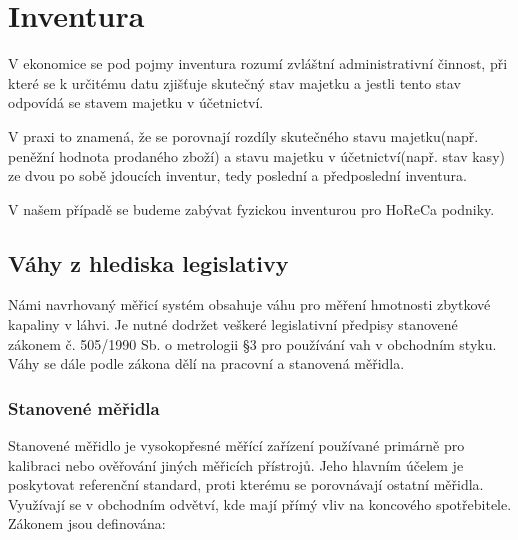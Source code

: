 \chapter{Inventura}
\label{inventura}

V ekonomice se pod pojmy inventura rozumí zvláštní administrativní činnost, při které se k určitému datu zjišťuje skutečný stav majetku a jestli tento stav odpovídá se stavem majetku v účetnictví. 
\cite{Zákon o účetnictví}

V praxi to znamená, že se porovnají rozdíly skutečného stavu majetku(např. peněžní hodnota prodaného zboží) a stavu majetku v účetnictví(např. stav kasy) ze dvou po sobě jdoucích inventur, tedy poslední a předposlední inventura.

V našem případě se budeme zabývat fyzickou inventurou pro HoReCa podniky. %

\section{Váhy z hlediska legislativy}
Námi navrhovaný měřicí systém obsahuje váhu pro měření hmotnosti zbytkové kapaliny v láhvi. Je nutné dodržet veškeré legislativní předpisy stanovené zákonem č. 505/1990 Sb. o metrologii §3 pro používání vah v obchodním styku.
Váhy se dále podle zákona dělí na pracovní a stanovená měřidla. \cite{použití elektronických vah v obchodním styku}

\subsection{Stanovené měřidla}
Stanovené měřidlo je vysokopřesné měřící zařízení používané primárně pro kalibraci nebo ověřování jiných měřicích přístrojů. Jeho hlavním účelem je poskytovat referenční standard, proti kterému se porovnávají ostatní měřidla. Využívají se v obchodním odvětví, kde mají přímý vliv na koncového spotřebitele. Zákonem jsou definována:

